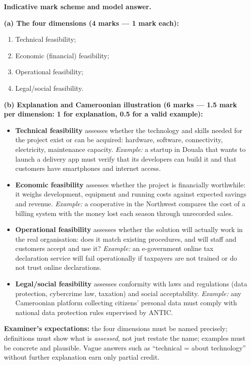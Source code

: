 \documentclass[11pt]{article}
\begin{document}
\begin{corrige}
\textbf{Indicative mark scheme and model answer.}

\textbf{(a) The four dimensions (4 marks — 1 mark each):}
\begin{enumerate}
\item Technical feasibility;
\item Economic (financial) feasibility;
\item Operational feasibility;
\item Legal/social feasibility.
\end{enumerate}

\textbf{(b) Explanation and Cameroonian illustration (6 marks — 1.5 mark per dimension: 1 for explanation, 0.5 for a valid example):}
\begin{itemize}
\item \textbf{Technical feasibility} assesses whether the technology and skills needed for the project exist or can be acquired: hardware, software, connectivity, electricity, maintenance capacity. \emph{Example:} a startup in Douala that wants to launch a delivery app must verify that its developers can build it and that customers have smartphones and internet access.
\item \textbf{Economic feasibility} assesses whether the project is financially worthwhile: it weighs development, equipment and running costs against expected savings and revenue. \emph{Example:} a cooperative in the Northwest compares the cost of a billing system with the money lost each season through unrecorded sales.
\item \textbf{Operational feasibility} assesses whether the solution will actually work in the real organisation: does it match existing procedures, and will staff and customers accept and use it? \emph{Example:} an e-government online tax declaration service will fail operationally if taxpayers are not trained or do not trust online declarations.
\item \textbf{Legal/social feasibility} assesses conformity with laws and regulations (data protection, cybercrime law, taxation) and social acceptability. \emph{Example:} any Cameroonian platform collecting citizens' personal data must comply with national data protection rules supervised by ANTIC.
\end{itemize}

\textbf{Examiner's expectations:} the four dimensions must be named precisely; definitions must show what is \emph{assessed}, not just restate the name; examples must be concrete and plausible. Vague answers such as ``technical = about technology'' without further explanation earn only partial credit.
\end{corrige}
\end{document}
